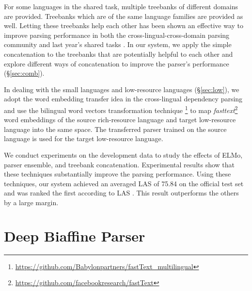 \documentclass[11pt,a4paper]{article}
\begin{document}
For some languages in the shared task, multiple treebanks of different domains are provided.
Treebanks which are of the same language families are provided as well.
Letting these treebanks help each other has been shown an effective way to improve parsing performance
in both the cross-lingual-cross-domain parsing community and last year's shared tasks \cite{TACL892,guo-EtAl:2015:ACL-IJCNLP2,che-EtAl:2017:K17-3,shi-EtAl:2017:K17-3,bjorkelund-EtAl:2017:K17-3}.
In our system, we apply the simple concatenation to the treebanks that are potentially
helpful to each other
and explore different ways of concatenation to improve the parser's performance (\S\ref{sec:comb}).

In dealing with the small languages and low-resource languages (\S\ref{sec:low}),
we adopt the word embedding transfer idea 
in the cross-lingual dependency parsing \cite{guo-EtAl:2015:ACL-IJCNLP2}
and use the bilingual word vectors transformation technique \cite{DBLP:journals/corr/SmithTHH17}\footnote{\url{https://github.com/Babylonpartners/fastText_multilingual}}
to map \textit{fasttext}\footnote{\url{https://github.com/facebookresearch/fastText}} word embeddings \cite{DBLP:journals/corr/BojanowskiGJM16}
of the source rich-resource language and target low-resource language
into the same space.
The transferred parser trained on the source language is used for the target low-resource language.

We conduct experiments on the development data to study
the effects of ELMo, parser ensemble, and treebank concatenation.
Experimental results show that these techniques substantially improve the parsing performance.
Using these techniques, our system achieved an averaged LAS of 75.84 on the official test set
and was ranked the first according to LAS \cite{udst:overview}.
This result outperforms the others by a large margin.

\section{Deep Biaffine Parser}\label{sec:biaffine}
\end{document}
